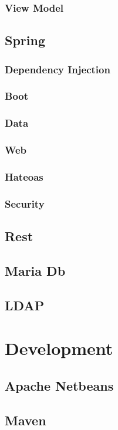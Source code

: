 \subsubsection{View Model}
\subsection{Spring}
\subsubsection{Dependency Injection}
\subsubsection{Boot}
\subsubsection{Data}
\subsubsection{Web}
\subsubsection{Hateoas}
\subsubsection{Security}

\subsection{Rest}
\subsection{Maria Db}
\subsection{LDAP}

\section{Development}
\subsection{Apache Netbeans}
\subsection{Maven}
